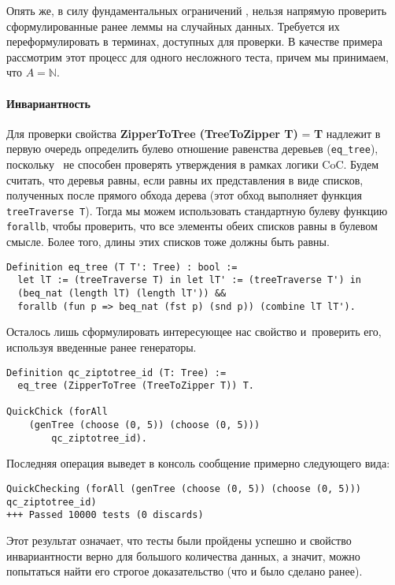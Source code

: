 Опять же, в силу фундаментальных ограничений \tqc, нельзя напрямую проверить сформулированные ранее леммы на случайных данных. Требуется их переформулировать в терминах, доступных для проверки. В качестве примера рассмотрим этот процесс для одного несложного теста, причем мы принимаем, что $A = \mathbb{N}$.

\paragraph{Инвариантность} Для проверки свойства \textbf{ZipperToTree (TreeToZipper T)} = \textbf{T} надлежит в первую очередь определить булево отношение равенства деревьев (\texttt{eq\_tree}), поскольку \tqc~не способен проверять утверждения в рамках логики CoC. Будем считать, что деревья равны, если равны их представления в виде списков, полученных после прямого обхода дерева (этот обход выполняет функция \texttt{treeTraverse T}). Тогда мы можем использовать стандартную булеву функцию \texttt{forallb}, чтобы проверить, что все элементы обеих списков равны в булевом смысле. Более того, длины этих списков тоже должны быть равны.
\begin{Verbatim}[fontsize=\small]
Definition eq_tree (T T': Tree) : bool :=
  let lT := (treeTraverse T) in let lT' := (treeTraverse T') in
  (beq_nat (length lT) (length lT')) &&
  forallb (fun p => beq_nat (fst p) (snd p)) (combine lT lT').
\end{Verbatim}

Осталось лишь сформулировать интересующее нас свойство и~проверить его, используя введенные ранее генераторы.

\begin{Verbatim}[fontsize=\small]
Definition qc_ziptotree_id (T: Tree) :=
  eq_tree (ZipperToTree (TreeToZipper T)) T.
  
QuickChick (forAll
	(genTree (choose (0, 5)) (choose (0, 5)))
		qc_ziptotree_id).
\end{Verbatim}

Последняя операция выведет в консоль сообщение примерно следующего вида:
\begin{Verbatim}[fontsize=\scriptsize]
QuickChecking (forAll (genTree (choose (0, 5)) (choose (0, 5))) qc_ziptotree_id)
+++ Passed 10000 tests (0 discards)
\end{Verbatim}
Этот результат означает, что тесты были пройдены успешно и свойство инвариантности верно для большого количества данных, а значит, можно попытаться найти его строгое доказательство (что и было сделано ранее).

